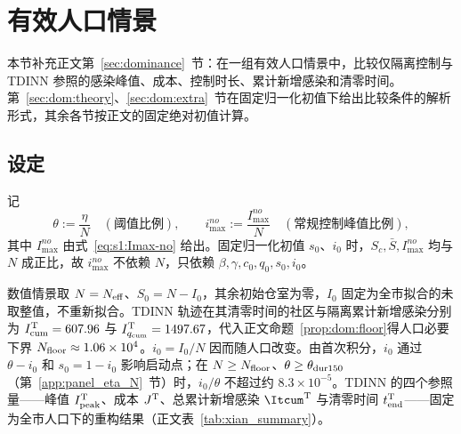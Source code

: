 \section{有效人口情景}
\label{sec:sup:population}
本节补充正文第~\ref{sec:dominance}~节：在一组有效人口情景中，比较仅隔离控制与 TDINN 参照的感染峰值、成本、控制时长、累计新增感染和清零时间。第~\ref{sec:dom:theory}、\ref{sec:dom:extra}~节在固定归一化初值下给出比较条件的解析形式，其余各节按正文的固定绝对初值计算。

\subsection{设定}
\label{sec:dom:setup}
记
\begin{equation}
  \theta:=\frac{\eta}{N}\quad(\text{阈值比例}),\qquad
  i_{\max}^{no}:=\frac{I_{\max}^{no}}{N}\quad(\text{常规控制峰值比例}),
  \label{eq:dom:ratios}
\end{equation}
其中 $I_{\max}^{no}$ 由式~\eqref{eq:s1:Imax-no} 给出。固定归一化初值 $s_0$、$i_0$ 时，$S_c,\bar S,I_{\max}^{no}$ 均与 $N$ 成正比，故 $i_{\max}^{no}$ 不依赖 $N$，只依赖 $\beta,\gamma,c_0,q_0,s_0,i_0$。

数值情景取 $N=N_{\rm eff}$、$S_0=N-I_0$，其余初始仓室为零，$I_0$ 固定为全市拟合的未取整值，不重新拟合。TDINN 轨迹在其清零时间的社区与隔离累计新增感染分别为 $I^{\rm T}_{\rm cum}=607.96$ 与 $I^{\rm T}_{q_{\rm cum}}=1497.67$，代入正文命题~\ref{prop:dom:floor}得人口必要下界 $N_{\rm floor}\approx1.06\times10^4$。$i_0=I_0/N$ 因而随人口改变。由首次积分，$i_0$ 通过 $\theta-i_0$ 和 $s_0=1-i_0$ 影响启动点；在 $N\ge N_{\rm floor}$、$\theta\ge\theta_{\rm dur150}$（第~\ref{app:panel_eta_N}~节）时，$i_0/\theta$ 不超过约 $8.3\times10^{-5}$。TDINN 的四个参照量——峰值 $I^{\rm T}_{\rm peak}$、成本 $J^{\rm T}$、总累计新增感染 $\Itcum^{\rm T}$ 与清零时间 $t_{\rm end}^{\rm T}$——固定为全市人口下的重构结果（正文表~\ref{tab:xian_summary}）。

